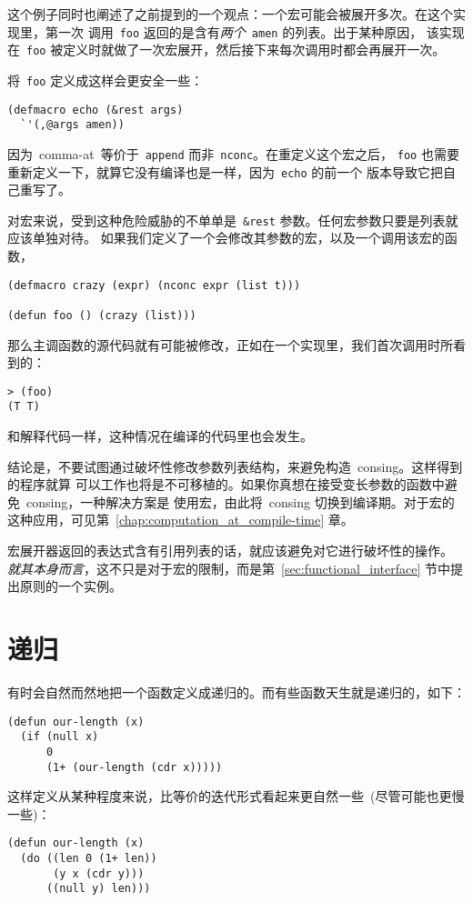 这个例子同时也阐述了之前提到的一个观点：一个宏可能会被展开多次。在这个实现里，第一次
调用~\texttt{foo} 返回的是含有\emph{两个}~\texttt{amen} 的列表。出于某种原因，
该实现在~\texttt{foo} 被定义时就做了一次宏展开，然后接下来每次调用时都会再展开一次。

将~\texttt{foo} 定义成这样会更安全一些：
\begin{lstlisting}
(defmacro echo (&rest args)
  `'(,@args amen))
\end{lstlisting}
因为~comma-at~等价于~\texttt{append} 而非~\texttt{nconc}。在重定义这个宏之后，
\texttt{foo} 也需要重新定义一下，就算它没有编译也是一样，因为~\texttt{echo} 的前一个
版本导致它把自己重写了。

对宏来说，受到这种危险威胁的不单单是~\texttt{\&rest} 参数。任何宏参数只要是列表就应该单独对待。
如果我们定义了一个会修改其参数的宏，以及一个调用该宏的函数，
\begin{lstlisting}
(defmacro crazy (expr) (nconc expr (list t)))

(defun foo () (crazy (list)))
\end{lstlisting}
那么主调函数的源代码就有可能被修改，正如在一个实现里，我们首次调用时所看到的：
\begin{lstlisting}
> (foo)
(T T)
\end{lstlisting}
和解释代码一样，这种情况在编译的代码里也会发生。

结论是，不要试图通过破坏性修改参数列表结构，来避免构造~consing。这样得到的程序就算
可以工作也将是不可移植的。如果你真想在接受变长参数的函数中避免~consing，一种解决方案是
使用宏，由此将~consing 切换到编译期。对于宏的这种应用，可见第~\ref{chap:computation_at_compile-time} 章。

宏展开器返回的表达式含有引用列表的话，就应该避免对它进行破坏性的操作。
\emph{就其本身而言}，这不只是对于宏的限制，而是第~\ref{sec:functional_interface}
节中提出原则的一个实例。

\section{递归}
\label{sec:recursion}

有时会自然而然地把一个函数定义成递归的。而有些函数天生就是递归的，如下：
\begin{lstlisting}
(defun our-length (x)
  (if (null x)
      0
      (1+ (our-length (cdr x)))))
\end{lstlisting}
这样定义从某种程度来说，比等价的迭代形式看起来更自然一些~(尽管可能也更慢一些)：
\begin{lstlisting}
(defun our-length (x)
  (do ((len 0 (1+ len))
       (y x (cdr y)))
      ((null y) len)))
\end{lstlisting}


